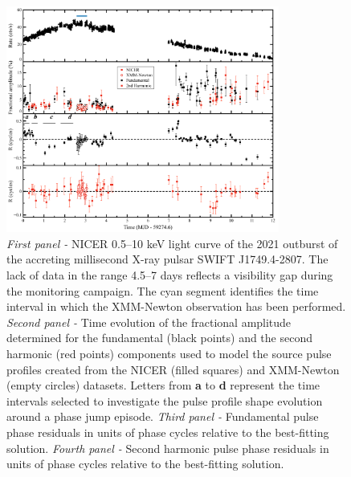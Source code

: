 \documentclass[fleqn,usenatbib]{mnras}
\newcommand{\swiftj}{SWIFT J1749.4-2807}
\newcommand{\nicer}{NICER}
\newcommand{\xmm}{XMM-Newton}
\begin{document}
\begin{figure}
\centering
\includegraphics[width=0.8\textwidth]{plot_lc_phase_residuals}
\caption{\textit{First panel -} \nicer{} 0.5--10 keV light curve of the 2021 outburst of the accreting millisecond X-ray pulsar \swiftj{}. The lack of data in the range 4.5--7 days reflects a visibility gap during the monitoring campaign. The cyan segment identifies the time interval in which the \xmm{} observation has been performed. \textit{Second panel -} Time evolution of the fractional amplitude determined for the fundamental (black points) and the second harmonic (red points) components used to model the source pulse profiles created from the \nicer{} (filled squares) and \xmm{} (empty circles) datasets. Letters from \textbf{a} to \textbf{d} represent the time intervals selected to investigate the pulse profile shape evolution around a phase jump episode. \textit{Third panel -} Fundamental pulse phase residuals in units of phase cycles relative to the best-fitting solution. \textit{Fourth panel -} Second harmonic pulse phase residuals in units of phase cycles relative to the best-fitting solution.}
\label{fig:phase_fit}
\end{figure} 


\end{document}
